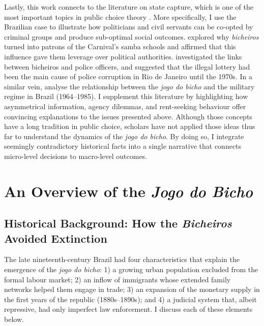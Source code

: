 \documentclass[a4paper,12pt]{article}
\begin{document}
Lastly, this work connects to the literature on state capture, which is one of the most important topics in public choice theory \citep{rose1978corruption,shleifer2002grabbing,tollison1982rent}. More specifically, I use the Brazilian case to illustrate how politicians and civil servants can be co-opted by criminal groups and produce sub-optimal social outcomes. \citet{queiroz1992carnaval} explored why \textit{bicheiros} turned into patrons of the Carnival's samba schools and affirmed that this influence gave them leverage over political authorities. \citet{misse2007illegal} investigated the links between bicheiros and police officers, and suggested that the illegal lottery had been the main cause of police corruption in Rio de Janeiro until the 1970s. In a similar vein, \citet{jupiara2015poroes} analyse the relationship between the \textit{jogo do bicho} and the military regime in Brazil (1964--1985). I supplement this literature by highlighting how asymmetrical information, agency dilemmas, and rent-seeking behaviour offer convincing explanations to the issues presented above. Although those concepts have a long tradition in public choice, scholars have not applied those ideas thus far to understand the dynamics of the \textit{jogo do bicho}. By doing so, I integrate seemingly contradictory historical facts into a single narrative that connects micro-level decisions to macro-level outcomes. 

\section{An Overview of the \textit{Jogo do Bicho}}
\label{sec:overview}

\subsection{Historical Background: How the \textit{Bicheiros} Avoided Extinction}
\label{sub:historical_background}

The late nineteenth-century Brazil had four characteristics that explain the emergence of the \textit{jogo do bicho}: 1) a growing urban population excluded from the formal labour market; 2) an inflow of immigrants whose extended family networks helped them engage in trade; 3) an expansion of the monetary supply in the first years of the republic (1880s--1890s); and 4) a judicial system that, albeit repressive, had only imperfect law enforcement. I discuss each of these elements below.
\end{document}
